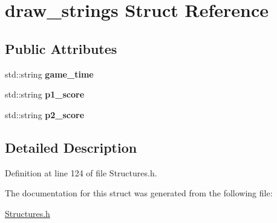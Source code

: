 \hypertarget{structdraw__strings}{\section{draw\+\_\+strings Struct Reference}
\label{structdraw__strings}
}
\subsection*{Public Attributes}
\begin{DoxyCompactItemize}
\item 
\hypertarget{structdraw__strings_a4d19f66b000d19861c475694328d9fce}{std\+::string {\bfseries game\+\_\+time}}\label{structdraw__strings_a4d19f66b000d19861c475694328d9fce}

\item 
\hypertarget{structdraw__strings_a0d59a0f9e78f1c539dbe7959dcd9c3bb}{std\+::string {\bfseries p1\+\_\+score}}\label{structdraw__strings_a0d59a0f9e78f1c539dbe7959dcd9c3bb}

\item 
\hypertarget{structdraw__strings_a749fa74ab7403f436f100c546b073be8}{std\+::string {\bfseries p2\+\_\+score}}\label{structdraw__strings_a749fa74ab7403f436f100c546b073be8}

\end{DoxyCompactItemize}


\subsection{Detailed Description}


Definition at line 124 of file Structures.\+h.



The documentation for this struct was generated from the following file\+:\begin{DoxyCompactItemize}
\item 
\hyperlink{_structures_8h}{Structures.\+h}\end{DoxyCompactItemize}

